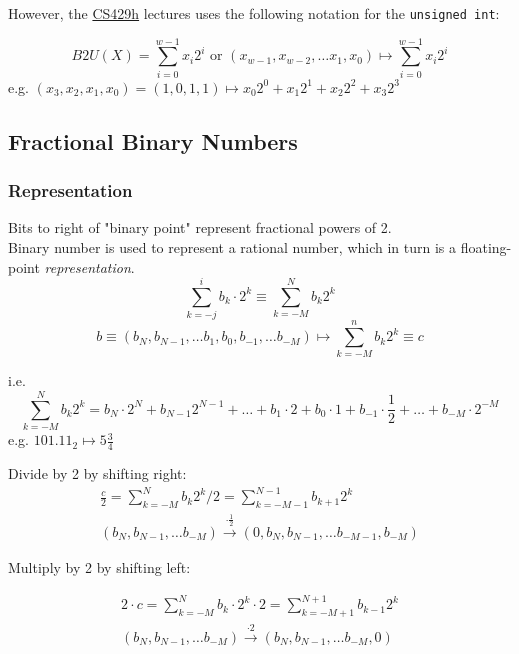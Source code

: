 \documentclass[10pt]{amsart}
\begin{document}
\begin{multicols*}{2}
However, the \href{https://www.cs.utexas.edu/users/fussell/courses/cs429h/lectures/Lecture_4-429h.pdf}{CS429h} lectures uses the following notation for the \texttt{unsigned int}:

\[
B2U(X) = \sum_{i=0}^{w-1} x_i 2^i \text{ or } (x_{w-1}, x_{w-2}, \dots x_1, x_0) \mapsto \sum_{i=0}^{w-1} x_i 2^i
\]
e.g. $(x_3, x_2, x_1, x_0) = (1, 0, 1, 1) \mapsto x_0 2^0 + x_1 2^1 + x_2 2^2 + x_3 2^3$

\subsection{Fractional Binary Numbers}

\subsubsection{Representation}

Bits to right of "binary point" represent fractional powers of 2. \\
Binary number is used to represent a rational number, which in turn is a floating-point \emph{representation}. 
\begin{equation}
\sum_{k=-j}^i b_k \cdot 2^k \equiv \sum_{k=-M}^N b_k 2^k
\end{equation}
\begin{equation}
b \equiv (b_N, b_{N-1}, \dots b_1, b_0, b_{-1}, \dots b_{-M}) \mapsto \sum_{k=-M}^n b_k 2^k \equiv c
\end{equation}

i.e. 
\[
\sum_{k=-M}^N b_k 2^k = b_N \cdot 2^N + b_{N-1} 2^{N-1} + \dots + b_1 \cdot 2 + b_0 \cdot 1 + b_{-1} \cdot \frac{1}{2} + \dots + b_{-M} \cdot 2^{-M}
\]
e.g. $101.11_2 \mapsto 5 \frac{3}{4} $ 

Divide by 2 by shifting right: 
\begin{equation}
\begin{gathered} 
\frac{c}{2} = \sum_{k=-M}^N b_k 2^k/2 = \sum_{k=-M-1}^{N-1} b_{k+1} 2^k \\	
(b_N, b_{N-1}, \dots b_{-M}) \xrightarrow{ \cdot \frac{1}{2}} (0, b_N, b_{N-1}, \dots b_{-M-1}, b_{-M})
\end{gathered} 
\end{equation}

Multiply by 2 by shifting left:

\begin{equation}
\begin{gathered}
2  \cdot c = \sum_{k=-M}^N b_k \cdot 2^k \cdot 2 = \sum_{k=-M+1}^{N+1} b_{k-1} 2^k \\
(b_N, b_{N-1}, \dots b_{-M}) \xrightarrow{ \cdot 2} (b_N, b_{N-1}, \dots b_{-M} , 0)
\end{gathered}
\end{equation}


\end{multicols*}
\end{document}
